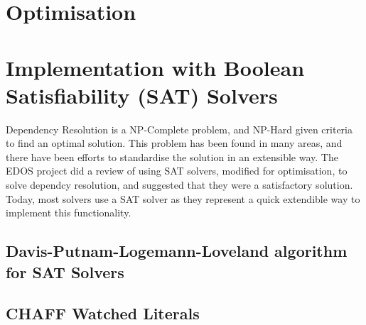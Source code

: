 \section{Optimisation}


\section{Implementation with Boolean Satisfiability (SAT) Solvers}
Dependency Resolution is a NP-Complete problem, and NP-Hard given criteria to find an optimal solution.
This problem has been found in many areas, and there have been efforts to standardise the solution in an extensible way.
The EDOS project did a review of using SAT solvers, modified for optimisation, to solve dependcy resolution, and suggested that they were a satisfactory solution.
Today, most solvers use a SAT solver as they represent a quick extendible way to implement this functionality.




\subsection{Davis-Putnam-Logemann-Loveland algorithm for SAT Solvers}


\subsection{CHAFF Watched Literals}

